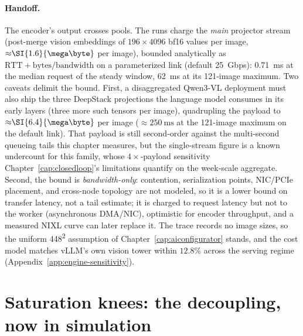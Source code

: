 \paragraph{Handoff.} The encoder's output crosses pools. The runs
charge the \emph{main} projector stream (post-merge vision embeddings
of $196 \times 4096$ bf16 values per image, ${\approx}\SI{1.6}{\mega\byte}$
per image), bounded
analytically as $\text{RTT} + \text{bytes}/\text{bandwidth}$ on a
parameterized link (default \SI{25}{Gbps}): \SI{0.71}{\milli\second} at
the median request of the steady window, \SI{62}{\milli\second} at its
121-image maximum. Two caveats delimit the bound. First, a
disaggregated Qwen3-VL deployment must also ship the three DeepStack
projections the language model consumes in its early layers (three more such
tensors per image), quadrupling the payload to
${\approx}\SI{6.4}{\mega\byte}$ per image (${\approx}\SI{250}{\milli\second}$
at the 121-image maximum on the default link). That payload is still
second-order against the multi-second queueing tails this chapter measures,
but the single-stream figure is a known undercount for this family, whose
$4\times$-payload sensitivity Chapter~\ref{cap:closedloop}'s limitations
quantify on the week-scale aggregate. Second, the bound is
\emph{bandwidth-only}: contention, serialization points, NIC/PCIe
placement, and cross-node topology are not modeled, so it is a lower
bound on transfer latency, not a tail estimate; it is charged to request
latency but not to the worker (asynchronous DMA/NIC), optimistic for encoder
throughput, and a measured NIXL curve can later replace it. The trace
records no image sizes, so the uniform 448\textsuperscript{2} assumption
of Chapter~\ref{cap:aiconfigurator} stands, and the cost model matches
vLLM's own vision tower within $12.8\%$ across the serving regime
(Appendix~\ref{app:engine-sensitivity}).

{\renewcommand{\sectionmark}[1]{}%
\section{Saturation knees: the decoupling, now in simulation}%
\label{sec:sim-knees}}

